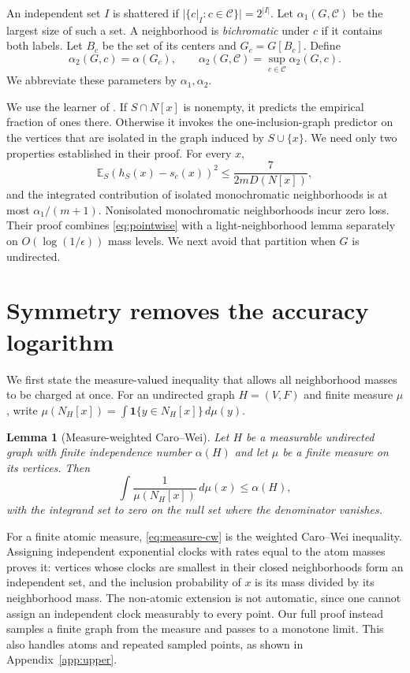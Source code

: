 \documentclass{article}
\newtheorem{lemma}[theorem]{Lemma}
\newcommand{\E}{\mathbb E}
\newcommand{\1}{\mathbf 1}
\begin{document}
An independent set $I$ is shattered if $|\{c|_I:c\in\mathcal C\}|=2^{|I|}$. Let $\alpha_1(G,\mathcal C)$ be the largest size of such a set. A neighborhood is \emph{bichromatic} under $c$ if it contains both labels. Let $B_c$ be the set of its centers and $G_c=G[B_c]$. Define \[ \alpha_2(G,c)=\alpha(G_c),\qquad \alpha_2(G,\mathcal C)=\sup_{c\in\mathcal C}\alpha_2(G,c). \] We abbreviate these parameters by $\alpha_1,\alpha_2$.

We use the learner of \citet{bressan2026}. If $S\cap N[x]$ is nonempty, it predicts the empirical fraction of ones there. Otherwise it invokes the one-inclusion-graph predictor on the vertices that are isolated in the graph induced by $S\cup\{x\}$. We need only two properties established in their proof. For every $x$,
\begin{equation}
 \E_S(h_S(x)-s_c(x))^2\le \frac{7}{2mD(N[x])},
 \label{eq:pointwise}
\end{equation}
and the integrated contribution of isolated monochromatic neighborhoods is at most $\alpha_1/(m+1)$. Nonisolated monochromatic neighborhoods incur zero loss. Their proof combines \eqref{eq:pointwise} with a light-neighborhood lemma separately on $O(\log(1/\epsilon))$ mass levels. We next avoid that partition when $G$ is undirected.

\section{Symmetry removes the accuracy logarithm}

We first state the measure-valued inequality that allows all neighborhood masses to be charged at once. For an undirected graph $H=(V,F)$ and finite measure $\mu$, write $\mu(N_H[x])=\int\1\{y\in N_H[x]\}\,d\mu(y)$.

\begin{lemma}[Measure-weighted Caro--Wei]\label{lem:measure-cw}
Let $H$ be a measurable undirected graph with finite independence number $\alpha(H)$ and let $\mu$ be a finite measure on its vertices. Then
\begin{equation}
 \int \frac{1}{\mu(N_H[x])}\,d\mu(x)\le \alpha(H),
 \label{eq:measure-cw}
\end{equation}
with the integrand set to zero on the null set where the denominator vanishes.
\end{lemma}

For a finite atomic measure, \eqref{eq:measure-cw} is the weighted Caro--Wei inequality. Assigning independent exponential clocks with rates equal to the atom masses proves it: vertices whose clocks are smallest in their closed neighborhoods form an independent set, and the inclusion probability of $x$ is its mass divided by its neighborhood mass. The non-atomic extension is not automatic, since one cannot assign an independent clock measurably to every point. Our full proof instead samples a finite graph from the measure and passes to a monotone limit. This also handles atoms and repeated sampled points, as shown in Appendix~\ref{app:upper}.
\end{document}
